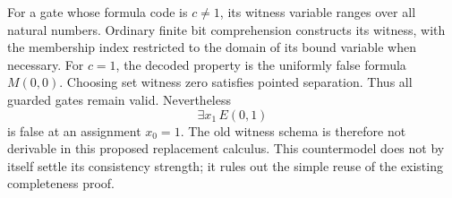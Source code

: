 For a gate whose formula code is $c\ne1$, its witness variable ranges
over all natural numbers. Ordinary finite bit comprehension constructs
its witness, with the membership index restricted to the domain of its
bound variable when necessary. For $c=1$, the decoded property is the
uniformly false formula $M(0,0)$. Choosing set witness zero satisfies
pointed separation. Thus all guarded gates remain valid. Nevertheless
\[
 \exists x_1\,E(0,1)
\]
is false at an assignment $x_0=1$. The old witness schema is therefore
not derivable in this proposed replacement calculus. This countermodel
does not by itself settle its consistency strength; it rules out the
simple reuse of the existing completeness proof.

